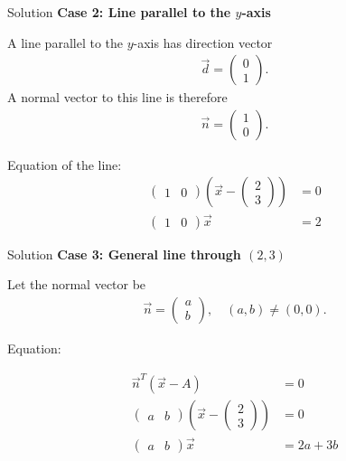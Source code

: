 \documentclass{beamer}
\begin{document}
\begin{frame}{Solution}
\textbf{Case 2: Line parallel to the $y$-axis}

 A line parallel to the $y$-axis has direction vector  
\begin{align}
\vec{d} = \begin{pmatrix}0 \\ 1\end{pmatrix}.
\end{align}
 A normal vector to this line is therefore  
\begin{align}
\vec{n} = \begin{pmatrix}1 \\ 0\end{pmatrix}.
\end{align}

Equation of the line:
\begin{align}
\begin{pmatrix}1 & 0\end{pmatrix}
\left(\vec{x} - \begin{pmatrix}2 \\ 3\end{pmatrix}\right) &= 0 \\[6pt]
\begin{pmatrix}1 & 0\end{pmatrix}\vec{x} &= 2
\end{align}
\end{frame}

\begin{frame}{Solution}
\textbf{Case 3: General line through $(2,3)$}

Let the normal vector be  
\begin{align}
\vec{n} = \begin{pmatrix}a \\ b\end{pmatrix}, \quad (a,b)\neq (0,0).
\end{align}

Equation:

\begin{align}
\vec{n}^T(\vec{x} - A) &= 0 \\[6pt]
\begin{pmatrix}a & b\end{pmatrix}
\left(\vec{x} - \begin{pmatrix}2 \\ 3\end{pmatrix}\right) &= 0 \\[6pt]
\begin{pmatrix}a & b\end{pmatrix}\vec{x} &= 2a+3b
\end{align}
\end{frame}
\end{document}
